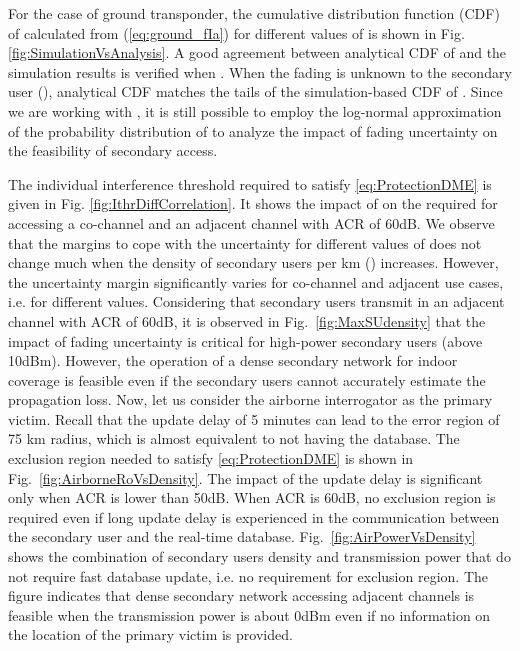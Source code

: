 \documentclass[12pt,submission,journal,onecolumn]{IEEEtran}
\begin{document}
For the case of ground transponder, the cumulative distribution function (CDF) of  calculated from (\ref{eq:ground_fIa}) for different values of  is shown in Fig. \ref{fig:SimulationVsAnalysis}. A good agreement between analytical CDF of  and the simulation results is verified when . When the fading is unknown to the secondary user (), analytical CDF matches the tails of the simulation-based CDF of . Since we are working with , it is still possible to employ the log-normal approximation of the probability distribution of  to analyze the impact of fading uncertainty on the feasibility of secondary access.

The individual interference threshold  required to satisfy \eqref{eq:ProtectionDME} is given in Fig. \ref{fig:IthrDiffCorrelation}. It shows the impact of  on the required  for accessing a co-channel and an adjacent channel with ACR of 60dB. We observe that the margins to cope with the uncertainty for different values of  does not change much when the density of secondary users per km () increases. However, the uncertainty margin significantly varies for co-channel and adjacent use cases, i.e. for different  values. Considering that secondary users transmit in an adjacent channel with ACR of 60dB, it is observed in Fig.~\ref{fig:MaxSUdensity} that the impact of fading uncertainty is critical for high-power secondary users (above 10dBm). However, the operation of a dense secondary network for indoor coverage is feasible even if the secondary users cannot accurately estimate the propagation loss. 
Now, let us consider the airborne interrogator as the primary victim. Recall that the update delay of 5 minutes can lead to the error region of 75 km radius, which is almost equivalent to not having the database. The exclusion region needed to satisfy \eqref{eq:ProtectionDME} is shown in Fig.~\ref{fig:AirborneRoVsDensity}. The impact of the update delay is significant only when ACR is lower than 50dB. When ACR is 60dB, no exclusion region is required even if long update delay is experienced in the communication between the secondary user and the real-time database. Fig.~\ref{fig:AirPowerVsDensity} shows the combination of secondary users density and transmission power that do not require fast database update, i.e. no requirement for exclusion region. The figure indicates that dense secondary network accessing adjacent channels is feasible when the transmission power is about 0dBm even if no information on the location of the primary victim is provided.
\end{document}
